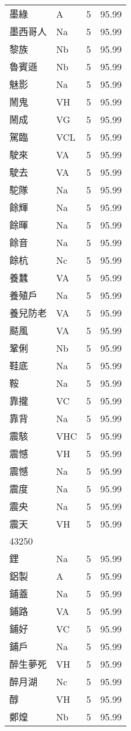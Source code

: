 \documentclass[twocolumn]{book}
\begin{document}
\begin{supertabular}{llrr}
墨綠 & A & 5 &  95.99\\
墨西哥人 & Na & 5 &  95.99\\
黎族 & Nb & 5 &  95.99\\
魯賓遜 & Nb & 5 &  95.99\\
魅影 & Na & 5 &  95.99\\
鬧鬼 & VH & 5 &  95.99\\
鬧成 & VG & 5 &  95.99\\
駕臨 & VCL & 5 &  95.99\\
駛來 & VA & 5 &  95.99\\
駛去 & VA & 5 &  95.99\\
駝隊 & Na & 5 &  95.99\\
餘輝 & Na & 5 &  95.99\\
餘暉 & Na & 5 &  95.99\\
餘音 & Na & 5 &  95.99\\
餘杭 & Nc & 5 &  95.99\\
養蠶 & VA & 5 &  95.99\\
養殖戶 & Na & 5 &  95.99\\
養兒防老 & VA & 5 &  95.99\\
颳風 & VA & 5 &  95.99\\
鞏俐 & Nb & 5 &  95.99\\
鞋底 & Na & 5 &  95.99\\
鞍 & Na & 5 &  95.99\\
靠攏 & VC & 5 &  95.99\\
靠背 & Na & 5 &  95.99\\
震駭 & VHC & 5 &  95.99\\
震憾 & VH & 5 &  95.99\\
震憾 & Na & 5 &  95.99\\
震度 & Na & 5 &  95.99\\
震央 & Na & 5 &  95.99\\
震天 & VH & 5 &  95.99\\
43250\\
鋰 & Na & 5 &  95.99\\
鋁製 & A & 5 &  95.99\\
鋪蓋 & Na & 5 &  95.99\\
鋪路 & VA & 5 &  95.99\\
鋪好 & VC & 5 &  95.99\\
鋪戶 & Na & 5 &  95.99\\
醉生夢死 & VH & 5 &  95.99\\
醉月湖 & Nc & 5 &  95.99\\
醇 & VH & 5 &  95.99\\
鄭煌 & Nb & 5 &  95.99\\

\end{supertabular}
\end{document}
